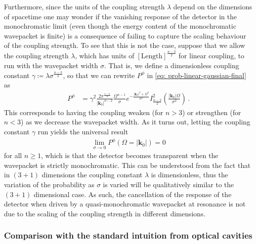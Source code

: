\documentclass[prd,twocolumn,superscriptaddress,nofootinbib,floatfix,amsmath,amssymb]{revtex4-2}
\newcommand{\bk}{{\bm{k}}}
\newcommand{\eri}[1]{\textcolor{OliveGreen}{\textbf{[\textbf{\textcolor{black}{Erickson}}: #1]}}}
\begin{document}
    
    Furthermore, since the units of the coupling strength $\lambda$ depend on the dimensions of spacetime one may wonder if the vanishing response of the detector in the monochromatic limit (even though the energy content of the monochromatic wavepacket is finite) is a consequence of failing to capture the scaling behaviour of the coupling strength. To see that this is not the case, suppose that we allow the coupling strength $\lambda$, which has units of $[\text{Length}]^\frac{n-3}{2}$ for linear coupling, to run with the wavepacket width $\sigma$. That is, we define a dimensionless coupling constant $\gamma \coloneqq \lambda \sigma^{\frac{n-3}{2}}$, so that we can rewrite $P^\phi$ in \eqref{eq: prob-linear-gaussian-final} as
    \begin{align}
        P^\phi &= \gamma^2  \frac{2\pi ^{\frac{4-n}{2}}}{|\bk_0|^{n-2}} \frac{\Omega ^{n-1}}{\sigma} e^{-\frac{|\bk_0|^2+\Omega ^2}{\sigma ^2}} I^2_{\frac{n-2}{2}}\left(\frac{|\bk_0| \Omega }{\sigma ^2}\right)\,.
    \end{align}
    This corresponds to having the coupling weaken (for $n>3$) or strengthen (for $n<3$) as we  decrease the wavepacket width. As it turns out, letting the coupling constant $\gamma$ run yields the universal result
    \begin{align}
        \lim_{\sigma \to 0}P^\phi(\Omega=|\bk_0|) = 0
    \end{align}
    for all $n\geq 1$, which is that the detector becomes transparent when the wavepacket is strictly monochromatic. This can be understood from the fact that in $(3+1)$ dimensions the coupling constant $\lambda$ is dimensionless, thus the variation of the probability as $\sigma$ is varied will be qualitatively similar to the $(3+1)$ dimensional case. As such, the cancellation of the response of the detector when driven by a quasi-monochromatic wavepacket at resonance is not due to the scaling of the coupling strength in different dimensions.
    
    
    
    
    
    
    
    \subsubsection*{Comparison with the standard intuition from optical cavities}
    \label{subsec: cavity-calculation}
    
    
\end{document}
